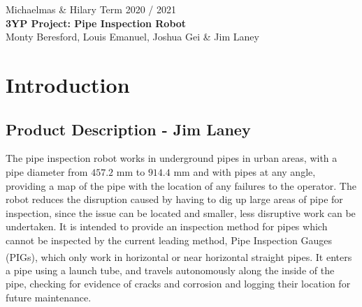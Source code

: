 \documentclass[11pt]{article}		%
\begin{document}
	
	\flushleft
	\raggedright

	\begin{center}
		\vspace*{2cm}
		Michaelmas \& Hilary Term 2020 / 2021\\ %
		\vspace*{6cm}
		\huge{\textbf{3YP Project: Pipe Inspection Robot}}\\ 
		\vspace*{6cm}
		\large{Monty Beresford, Louis Emanuel, Joshua Gei \& Jim Laney}
		\thispagestyle{empty} %
	\end{center}

	\newpage
	
	\tableofcontents
	\thispagestyle{empty} %
	\newpage

	\setcounter{page}{1}
	
	\section{Introduction}
	
	\subsection[Product Description]{Product Description - Jim Laney}
	
		The pipe inspection robot works in underground pipes in urban areas, with a pipe diameter from $457.2$ mm to $914.4$ mm and with pipes at any angle, providing a map of the pipe with the location of any failures to the operator. %
		The robot reduces the disruption caused by having to dig up large areas of pipe for inspection, since the issue can be located and smaller, less disruptive work can be undertaken.
		It is intended to provide an inspection method for pipes which cannot be inspected by the current leading method, Pipe Inspection Gauges (PIGs), which only work in horizontal or near horizontal straight pipes\textsuperscript{\cite{mills2017advances}}.
		It enters a pipe using a launch tube, and travels autonomously along the inside of the pipe, checking for evidence of cracks and corrosion and logging their location for future maintenance.
		\\
		
\end{document}
